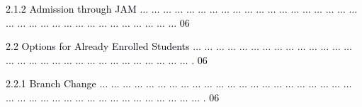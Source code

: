 \documentclass[12pt]{article}
\begin{document}
\vspace{\baselineskip}
\begin{adjustwidth}{0.5in}{0.0in}
{\fontsize{7pt}{8.4pt}\selectfont \textcolor[HTML]{00000A}{2.1.2 Admission through JAM $ \ldots $ $ \ldots $ $ \ldots $ $ \ldots $ $ \ldots $ $ \ldots $ $ \ldots $ $ \ldots $ $ \ldots $ $ \ldots $ $ \ldots $ $ \ldots $ $ \ldots $ $ \ldots $ $ \ldots $ $ \ldots $ $ \ldots $ $ \ldots $ $ \ldots $ $ \ldots $ $ \ldots $ $ \ldots $ $ \ldots $ $ \ldots $ $ \ldots $ $ \ldots $ $ \ldots $ $ \ldots $ $ \ldots $ $ \ldots $ $ \ldots $ $ \ldots $ $ \ldots $ $ \ldots $  06}\par}\par

\end{adjustwidth}


\vspace{\baselineskip}
\begin{adjustwidth}{0.21in}{0.0in}
{\fontsize{7pt}{8.4pt}\selectfont \textcolor[HTML]{00000A}{2.2 Options for Already Enrolled Students $ \ldots $ $ \ldots $ $ \ldots $ $ \ldots $ $ \ldots $ $ \ldots $ $ \ldots $ $ \ldots $ $ \ldots $ $ \ldots $ $ \ldots $ $ \ldots $ $ \ldots $ $ \ldots $ $ \ldots $ $ \ldots $ $ \ldots $ $ \ldots $ $ \ldots $ $ \ldots $ $ \ldots $ $ \ldots $ $ \ldots $ $ \ldots $ $ \ldots $ $ \ldots $ $ \ldots $ $ \ldots $ $ \ldots $ $ \ldots $ . 06}\par}\par

\end{adjustwidth}


\vspace{\baselineskip}
\begin{adjustwidth}{0.5in}{0.0in}
{\fontsize{7pt}{8.4pt}\selectfont \textcolor[HTML]{00000A}{2.2.1 Branch Change $ \ldots $ $ \ldots $ $ \ldots $ $ \ldots $ $ \ldots $ $ \ldots $ $ \ldots $ $ \ldots $ $ \ldots $ $ \ldots $ $ \ldots $ $ \ldots $ $ \ldots $ $ \ldots $ $ \ldots $ $ \ldots $ $ \ldots $ $ \ldots $ $ \ldots $ $ \ldots $ $ \ldots $ $ \ldots $ $ \ldots $ $ \ldots $ $ \ldots $ $ \ldots $ $ \ldots $ $ \ldots $ $ \ldots $ $ \ldots $ $ \ldots $ $ \ldots $ $ \ldots $ $ \ldots $ $ \ldots $ $ \ldots $ $ \ldots $ $ \ldots $ $ \ldots $ . 06}\par}\par

\end{adjustwidth}
\end{document}
